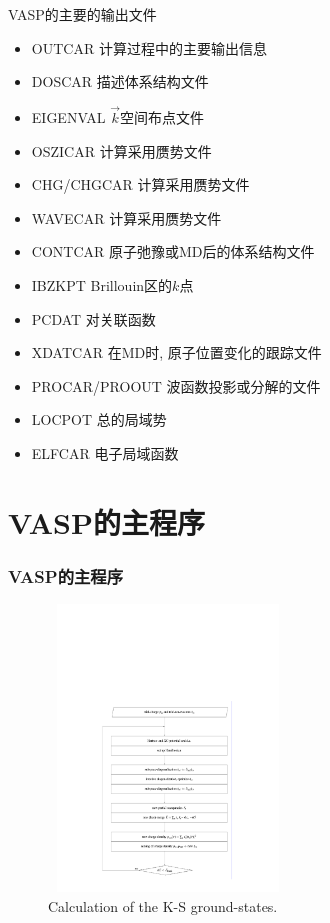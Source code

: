 \documentclass[cjk,slidestop,compress,mathserif,blue]{beamer}
\begin{document}
\frame
{
\textrm{VASP}的主要的输出文件
\begin{itemize}
	\item \textrm{OUTCAR} 计算过程中的主要输出信息
	\item \textrm{DOSCAR} 描述体系结构文件
	\item \textrm{EIGENVAL} $\vec k$空间布点文件
	\item \textrm{OSZICAR} 计算采用赝势文件
	\item \textrm{CHG/CHGCAR} 计算采用赝势文件
	\item \textrm{WAVECAR} 计算采用赝势文件
	\item \textrm{CONTCAR} 原子弛豫或\textrm{MD}后的体系结构文件
	\item \textrm{IBZKPT} \textrm{Brillouin}区的$k$点
	\item \textrm{PCDAT} 对关联函数
	\item \textrm{XDATCAR} 在\textrm{MD}时, 原子位置变化的跟踪文件
	\item \textrm{PROCAR/PROOUT} 波函数投影或分解的文件
	\item \textrm{LOCPOT} 总的局域势
	\item \textrm{ELFCAR} 电子局域函数
\end{itemize}

}
\section{VASP的主程序}
\frame
{
\frametitle{VASP的主程序}
\begin{figure}[h!]
\centering
\vspace*{-0.25in}
\includegraphics[height=3.0in,width=2.5in,viewport=125 42 474 555,clip]{Figures/VASP_Follow.pdf}
\caption{\small \textrm{Calculation of the K-S ground-states.}}%
\label{VASP_Follow}
\end{figure}
}
\end{document}
